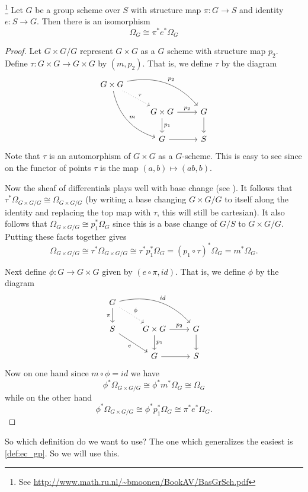 \documentclass[11pt]{article}
\begin{document}
\begin{lem}\label{lem:omegaTinvariant}{\footnote{See \url{http://www.math.ru.nl/~bmoonen/BookAV/BasGrSch.pdf}}}
	Let $G$ be a group scheme over $S$ with structure map $\pi:G\to S$ and identity $e:S\to G$. Then there is an isomorphism
	$$
	\Omega_G \cong \pi^*e^*\Omega_G
	$$
\end{lem}
\begin{proof}
	Let $G\times G / G$ represent $G\times G$ as a $G$ scheme with structure map $p_2$. Define $\tau:G\times G \to G\times G$ by $(m,p_2)$. That is, we define $\tau$ by the diagram
	$$
	\begin{tikzcd}
		G \times G \drar[dotted]{\tau} \ar[bend left]{drr}{p_2} \ar[bend right]{ddr}{m}
		\\
		& G\times G \rar{p_2} \dar{p_1} & G \dar
		\\
		& G \rar & S
	\end{tikzcd}
	$$
	Note that $\tau$ is an automorphism of $G\times G$ as a $G$-scheme. This is easy to see since on the functor of points $\tau$ is the map $(a,b) \mapsto (ab,b)$.
	
	Now the sheaf of differentials plays well with base change (see \cite[Prop.~6.1.24a]{liu2006algebraic}). It follows that $\tau^*\Omega_{G\times G/G} \cong \Omega_{G\times G/G}$ (by writing a base changing $G\times G/G$ to itself along the identity and replacing the top map with $\tau$, this will still be cartesian). It also follows that $\Omega_{G\times G/G} \cong p_1^*\Omega_G$ since this is a base change of $G/S$ to $G\times G/G$.
	Putting these facts together gives
	$$
		\Omega_{G\times G/G}
		\cong \tau^*\Omega_{G\times G/G}
		\cong \tau^*p_1^*\Omega_G
		= (p_1\circ\tau)^*\Omega_G
		= m^*\Omega_G.
	$$

	Next define $\phi:G \to G\times G$ given by $(e\circ\pi,id)$. That is, we define $\phi$ by the diagram
	$$
	\begin{tikzcd}
		G  \drar[dotted]{\phi} \ar[bend left]{drr}{id} \dar[swap]{\pi}
		\\
		S \drar[swap]{e} & G\times G \rar{p_2} \dar{p_1} & G \dar
		\\
		& G \rar & S
	\end{tikzcd}
	$$
	Now on one hand since $m\circ\phi = id$ we have
	$$
	\phi^*\Omega_{G\times G/G}
	\cong \phi^*m^*\Omega_G
	\cong \Omega_G
	$$
	while on the other hand
	$$
	\phi^*\Omega_{G\times G/G}
	\cong \phi^*p_1^*\Omega_G
	\cong \pi^*e^*\Omega_G.
	$$
\end{proof}

So which definition do we want to use? The one which generalizes the easiest is \autoref{def:ec_gp}. So we will use this.
\end{document}
